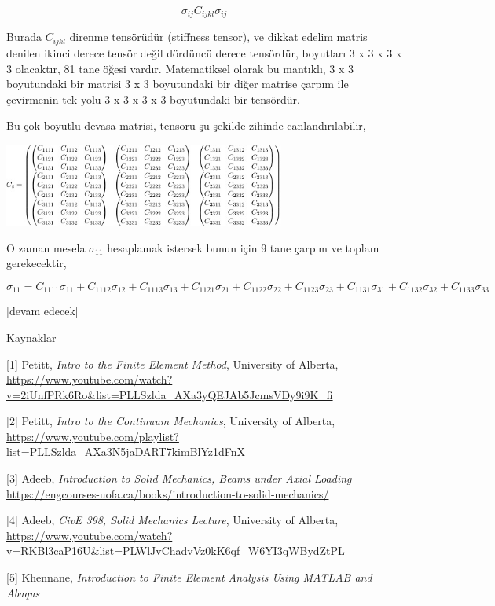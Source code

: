 \documentclass[12pt,fleqn]{article}\usepackage{../../common}
\begin{document}
$$
\sigma_{ij} C_{ijkl} \sigma_{ij}
$$

Burada $C_{ijkl}$ direnme tensörüdür (stiffness tensor), ve dikkat edelim matris
denilen ikinci derece tensör değil dördüncü derece tensördür, boyutları 3 x 3 x
3 x 3 olacaktır, 81 tane öğesi vardır. Matematiksel olarak bu mantıklı, 3 x 3
boyutundaki bir matrisi 3 x 3 boyutundaki bir diğer matrise çarpım ile
çevirmenin tek yolu 3 x 3 x 3 x 3 boyutundaki bir tensördür.

Bu çok boyutlu devasa matrisi, tensoru şu şekilde zihinde canlandırılabilir,

\includegraphics[width=25em]{phy_020_strs_04_09.jpg}

O zaman mesela $\sigma_{11}$ hesaplamak istersek bunun için 9 tane çarpım ve
toplam gerekecektir,

$$
\sigma_{11} = C_{1111}\sigma_{11} + C_{1112}\sigma_{12} +
C_{1113}\sigma_{13} + C_{1121}\sigma_{21} + C_{1122}\sigma_{22} +
C_{1123}\sigma_{23} + C_{1131}\sigma_{31} + C_{1132}\sigma_{32} +
C_{1133}\sigma_{33}
$$








[devam edecek]

Kaynaklar

[1] Petitt, {\em Intro to the Finite Element Method}, University of Alberta,
    \url{https://www.youtube.com/watch?v=2iUnfPRk6Ro&list=PLLSzlda_AXa3yQEJAb5JcmsVDy9i9K_fi}

[2] Petitt, {\em Intro to the Continuum Mechanics}, University of Alberta,
    \url{https://www.youtube.com/playlist?list=PLLSzlda_AXa3N5jaDART7kimBlYz1dFnX}

[3] Adeeb, {\em Introduction to Solid Mechanics, Beams under Axial Loading}
    \url{https://engcourses-uofa.ca/books/introduction-to-solid-mechanics/}
    
[4] Adeeb, {\em CivE 398, Solid Mechanics Lecture}, University of Alberta,
    \url{https://www.youtube.com/watch?v=RKBl3caP16U&list=PLWlJvChadvVz0kK6qf_W6YI3qWBydZtPL}

[5] Khennane, {\em Introduction to Finite Element Analysis Using MATLAB and Abaqus}
    
\end{document}
